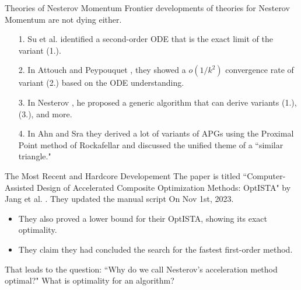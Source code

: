 \documentclass[11pt]{beamer}
\theoremstyle{definition}
\begin{document}
    \begin{frame}{Theories of Nesterov Momentum}
        Frontier developments of theories for Nesterov Momentum are not dying either. 
        \begin{itemize}
            \item [1.] Su et al. \cite{su_differential_2015} identified a second-order ODE that is the exact limit of the variant (1.). 
            \item [2.] In Attouch and Peypouquet \cite{attouch_rate_2016}, they showed a $o(1/k^2)$ convergence rate of variant (2.) based on the ODE understanding. 
            \item [3.] In Nesterov \cite{nesterov_lecture_2018}, he proposed a generic algorithm that can derive variants (1.), (3.), and more. 
            \item [4.] In Ahn and Sra \cite{ahn_understanding_2022}
            they derived a lot of variants of APGs using the Proximal Point method of Rockafellar and discussed the unified theme of a ``similar triangle." 
        \end{itemize}
    \end{frame}
    \begin{frame}{The Most Recent and Hardcore Developement}
        The paper is titled ``Computer-Assisted Design of Accelerated Composite Optimization Methods: OptISTA" by Jang et al. \cite{jang_computer-assisted_2023}.
        They updated the manual script On Nov 1st, 2023. 
        \begin{itemize}
            \item They also proved a lower bound for their OptISTA, showing its exact optimality. 
            \item They claim they had concluded the search for the fastest first-order method. 
        \end{itemize}
        That leads to the question: ``Why do we call Nesterov's acceleration method optimal?" 
        What is optimality for an algorithm? 
    \end{frame}
\end{document}
